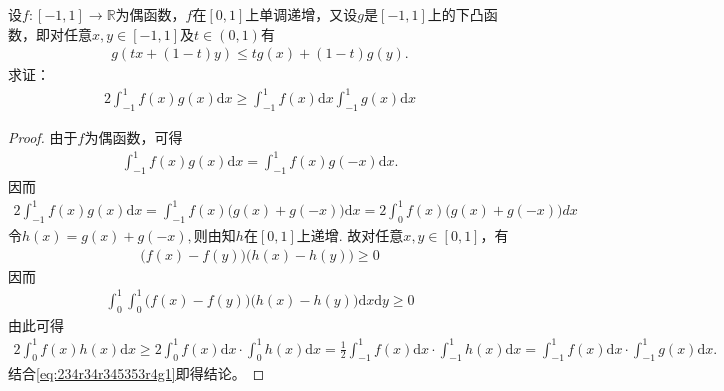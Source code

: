 \documentclass[../../main.tex]{subfiles}%
\begin{document}
\begin{example}
设$f:[-1,1]\to\mathbb{R}$为偶函数，$f$在$[0,1]$上单调递增，又设$g$是$[-1,1]$上的下凸函数，即对任意$x,y\in[-1,1]$及$t\in(0,1)$有
\begin{align*}
g(tx+(1-t)y)\leqslant tg(x)+(1-t)g(y).
\end{align*}
求证：
\begin{align*}
2\int_{-1}^1 f(x)g(x)\mathrm{d}x\geqslant \int_{-1}^1 f(x)\mathrm{d}x\int_{-1}^1 g(x)\mathrm{d}x
\end{align*}
\end{example}
\begin{proof}
由于$f$为偶函数，可得
\begin{align*}
\int_{-1}^1 f(x)g(x)\mathrm{d}x = \int_{-1}^1 f(x)g(-x)\mathrm{d}x.
\end{align*}
因而
\begin{align}\label{eq:234r34r345353r4g1}
2\int_{-1}^1 f(x)g(x)\mathrm{d}x = \int_{-1}^1 f(x)\bigl(g(x) + g(-x)\bigr)\mathrm{d}x = 2\int_0^1 f(x)\bigl(g(x) + g(-x)\bigr)dx
\end{align}
令$h(x) = g(x) + g(-x),$则由知$h$在$[0,1]$上递增.
故对任意$x,y \in [0,1]$，有
\begin{align*}
\bigl(f(x) - f(y)\bigr)\bigl(h(x) - h(y)\bigr) \geqslant 0
\end{align*}
因而
\begin{align*}
\int_0^1 \int_0^1 \bigl(f(x) - f(y)\bigr)\bigl(h(x) - h(y)\bigr)\mathrm{d}x\mathrm{d}y \geqslant 0
\end{align*}
由此可得
\begin{align*}
2\int_0^1 f(x)h(x)\mathrm{d}x \geqslant 2\int_0^1 f(x)\mathrm{d}x \cdot \int_0^1 h(x)\mathrm{d}x = \frac{1}{2}\int_{-1}^1 f(x)\mathrm{d}x \cdot \int_{-1}^1 h(x)\mathrm{d}x = \int_{-1}^1 f(x)\mathrm{d}x \cdot \int_{-1}^1 g(x)\mathrm{d}x.
\end{align*}
结合\eqref{eq:234r34r345353r4g1}即得结论。
\end{proof}
\end{document}
